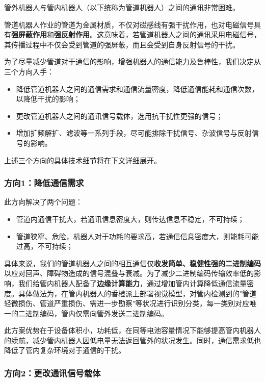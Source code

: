\documentclass[12pt, a4paper]{article}
\begin{document}
管外机器人与管内机器人（以下统称为管道机器人）之间的通讯非常困难。

管道机器人作业的管道为金属材质，不仅对磁感线有强干扰作用，也对电磁信号具有\textbf{强屏蔽作用}和\textbf{强反射作用}。这意味着，若管道机器人之间的通讯采用电磁信号，其传播过程中不仅会受到管道的强屏蔽，而且会受到自身反射信号的干扰。

为了尽量减少管道对于通信的影响，增强机器人的通信能力及鲁棒性，我们决定从三个方向入手：

\begin{itemize}
    \item 降低管道机器人之间的通信需求和通信流量密度，降低通信能耗和通信次数，以降低干扰的影响；
    \item 更改管道机器人之间的通讯信号载体，选用抗干扰性更强的信号；
    \item 增加扩频解扩、滤波等一系列手段，尽可能排除干扰信号、杂波信号与反射信号的影响。
\end{itemize}

上述三个方向的具体技术细节将在下文详细展开。

\subsubsection{方向1：降低通信需求}

此方向解决了两个问题：

\begin{itemize}
    \item 管道内通信干扰大，若通讯信息密度大，则传达信息不稳定，不可持续；
    \item 管道狭窄、危险，机器人对于功耗的要求高，若通信信息密度大，则能耗可能过高，不可持续；
\end{itemize}

具体来说，我们的管道机器人之间的相互通信仅\textbf{收发简单、稳健性强的二进制编码}以应对回声、障碍物造成的信号混叠与衰减。为了减少二进制编码传输效率低的影响，我们给管内机器人配备了\textbf{边缘计算能力}，通过增加管内计算降低通信流量密度。具体做法为，在管内机器人的香橙派上部署视觉模型，对管内检测到的"管道轻微损伤、管道严重损伤、需进一步勘察"等状况进行识别分类，每一类别对应唯一的二进制编码，管内仅需向管外发送二进制编码。 

此方案优势在于设备体积小，功耗低，在同等电池容量情况下能够提高管内机器人的续航，减少管内机器人因低电量无法返回管外的状况发生。同时，通信需求低也降低了管内复杂环境对于通信的干扰。

\subsubsection{方向2：更改通讯信号载体}
\end{document}
